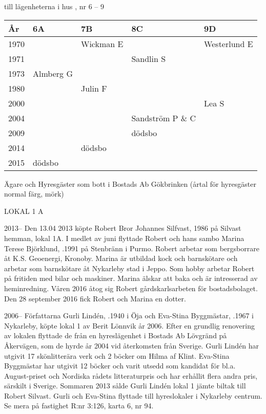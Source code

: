  till lägenheterna i hus , nr 6 – 9
\begin{center}
  \begin{tabular}{l l l l l}
    År & 6A & 7B & 8C & 9D \\ \hline
    1970 &   & Wickman E &   & Westerlund E \\
    1971 &   &   & Sandlin S &  \\
    1973 & Almberg G &   &   &  \\
    1980 &   & Julin F &   &  \\
    2000 &   &   &   & Lea S \\
    2004 &   &   & Sandström P \& C &  \\
    2009 &   &   & dödsbo &  \\
    2014 &   & dödsbo &   &  \\
    2015 & dödsbo &   &   &  \\
  \end{tabular}
\end{center}

Ägare och Hyresgäster som bott i Bostads Ab Gökbrinken (årtal för hyresgäster normal färg,  mörk)

LOKAL 1 A

 2013--
Den 13.04 2013 köpte Robert Bror Johannes Silfvast,  1986 på Silvast hemman, lokal 1A.  I medlet av juni flyttade Robert och hans sambo Marina Terese Björklund, .1991 på Stenbränn i Purmo. Robert arbetar som bergsborrare åt K.S. Geoenergi, Kronoby. Marina är utbildad kock och barnskötare och arbetar som barnskötare åt Nykarleby stad i Jeppo. Som hobby arbetar Robert på fritiden med bilar och maskiner. Marina älskar att baka och är intresserad av heminredning. Våren 2016 åtog sig Robert gårdskarlsarbeten för bostadsbolaget. Den 28 september 2016 fick Robert och Marina en dotter.

	2006--
Författarna Gurli Lindén, .1940 i Öja och Eva-Stina Byggmästar, .1967 i Nykarleby, köpte lokal 1 av Berit Lönnvik år 2006. Efter en grundlig renovering av lokalen flyttade de från en hyreslägenhet i Bostads Ab Lövgränd på Åkervägen, som de hyrde år 2004 vid återkomsten från Sverige. Gurli Lindén har utgivit 17 skönlitterära verk och 2 böcker om Hilma af Klint. Eva-Stina Byggmästar har utgivit 12 böcker och varit utsedd som kandidat för bl.a. August-priset och Nordiska rådets litteraturpris och har erhållit flera andra pris, särskilt i Sverige. Sommaren 2013 sålde Gurli Lindén lokal 1 jämte biltak till Robert Silvast. Gurli och Eva-Stina flyttade till  hyreslokaler i Nykarleby centrum. Se mera på fastighet R:nr 3:126, karta 6, nr 94.

